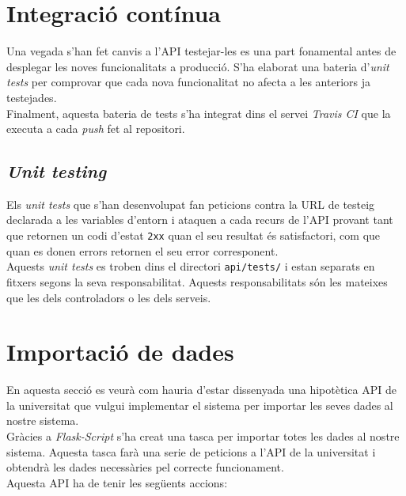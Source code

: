 \section{Integració contínua}

Una vegada s'han fet canvis a l'\ac{API} testejar-les es una part fonamental antes de desplegar les noves funcionalitats a producció. S'ha elaborat una bateria d'\emph{unit tests} per comprovar que cada nova funcionalitat no afecta a les anteriors ja testejades.\\

Finalment, aquesta bateria de tests s'ha integrat dins el servei \emph{Travis CI} que la executa a cada \emph{push} fet al repositori.

\subsection{\emph{Unit testing}}

Els \emph{unit tests} que s'han desenvolupat fan peticions contra la \ac{URL} de testeig declarada a les variables d'entorn i ataquen a cada recurs de l'\ac{API} provant tant que retornen un codi d'estat \texttt{2xx} quan el seu resultat és satisfactori, com que quan es donen errors retornen el seu error corresponent.\\

Aquests \emph{unit tests} es troben dins el directori \texttt{api/tests/} i estan separats en fitxers segons la seva responsabilitat. Aquests responsabilitats són les mateixes que les dels controladors o les dels serveis.

\section{Importació de dades}

En aquesta secció es veurà com hauria d'estar dissenyada una hipotètica \ac{API} de la universitat que vulgui implementar el sistema per importar les seves dades al nostre sistema.\\

Gràcies a \emph{Flask-Script} s'ha creat una tasca per importar totes les dades al nostre sistema. Aquesta tasca farà una serie de peticions a l'\ac{API} de la universitat i obtendrà les dades necessàries pel correcte funcionament.\\

Aquesta \ac{API} ha de tenir les següents accions:

